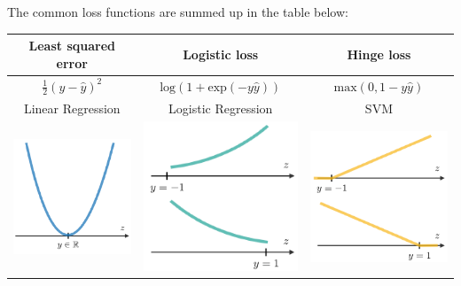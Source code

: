 \documentclass[letterpaper, 10.5pt,landscape]{article}
\begin{document}
\begin{multicols*}{3}
\vspace{3pt}
The common loss functions are summed up in the table below:
\vspace{-5pt}
\begin{center}
    \begin{tabular}{c|c|c}
            \textbf{Least squared error} & \textbf{Logistic loss} & \textbf{Hinge loss} \\
            \hline
             $\frac{1}{2}(y-\hat{y})^{2}$ & $\text{log}\left(1+\text{exp}(-y\hat{y})\right)$ & $\text{max}(0, 1-y\hat{y})$  \\
            \hline 
            Linear Regression & Logistic Regression & SVM \\
            \hline
            \includegraphics[scale = 0.4]{figures/least_squared_loss_func.PNG} &
            \includegraphics[scale = 0.4]{figures/logistic_loss_func.PNG} &
            \includegraphics[scale = 0.4]{figures/hinge_loss_func.PNG}
    \end{tabular}
\end{center}




\end{multicols*}
\end{document}
